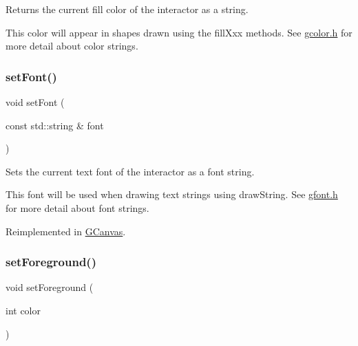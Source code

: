 Returns the current fill color of the interactor as a string. 

This color will appear in shapes drawn using the fill\+Xxx methods. See \mbox{\hyperlink{gcolor_8h_source}{gcolor.\+h}} for more detail about color strings. \mbox{\label{classGDrawingSurface_a8e096e8818d838aceae1d46d58fb3a7b}} 
\subsubsection{\texorpdfstring{set\+Font()}{setFont()}}
{\footnotesize\ttfamily void set\+Font (\begin{DoxyParamCaption}\item[{const std\+::string \&}]{font }\end{DoxyParamCaption})\hspace{0.3cm}{\ttfamily [virtual]}}



Sets the current text font of the interactor as a font string. 

This font will be used when drawing text strings using draw\+String. See \mbox{\hyperlink{gfont_8h_source}{gfont.\+h}} for more detail about font strings. 

Reimplemented in \mbox{\hyperlink{classGCanvas_a51367c9fd2709973b1f7238734f93891}{G\+Canvas}}.

\mbox{\label{classGDrawingSurface_a7daa57084b5811b598fce8726660b328}} 
\subsubsection{\texorpdfstring{set\+Foreground()}{setForeground()}\hspace{0.1cm}{\footnotesize\ttfamily [1/2]}}
{\footnotesize\ttfamily void set\+Foreground (\begin{DoxyParamCaption}\item[{int}]{color }\end{DoxyParamCaption})\hspace{0.3cm}{\ttfamily [virtual]}}



